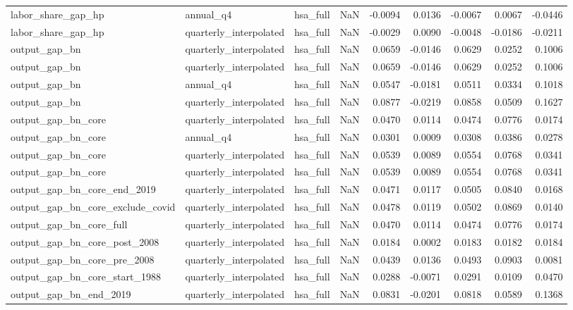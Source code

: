\begin{tabular}{lllrrrrrr}
labor\_share\_gap\_hp & annual\_q4 & hsa\_full & NaN & -0.0094 & 0.0136 & -0.0067 & 0.0067 & -0.0446 \\
labor\_share\_gap\_hp & quarterly\_interpolated & hsa\_full & NaN & -0.0029 & 0.0090 & -0.0048 & -0.0186 & -0.0211 \\
output\_gap\_bn & quarterly\_interpolated & hsa\_full & NaN & 0.0659 & -0.0146 & 0.0629 & 0.0252 & 0.1006 \\
output\_gap\_bn & quarterly\_interpolated & hsa\_full & NaN & 0.0659 & -0.0146 & 0.0629 & 0.0252 & 0.1006 \\
output\_gap\_bn & annual\_q4 & hsa\_full & NaN & 0.0547 & -0.0181 & 0.0511 & 0.0334 & 0.1018 \\
output\_gap\_bn & quarterly\_interpolated & hsa\_full & NaN & 0.0877 & -0.0219 & 0.0858 & 0.0509 & 0.1627 \\
output\_gap\_bn\_core & quarterly\_interpolated & hsa\_full & NaN & 0.0470 & 0.0114 & 0.0474 & 0.0776 & 0.0174 \\
output\_gap\_bn\_core & annual\_q4 & hsa\_full & NaN & 0.0301 & 0.0009 & 0.0308 & 0.0386 & 0.0278 \\
output\_gap\_bn\_core & quarterly\_interpolated & hsa\_full & NaN & 0.0539 & 0.0089 & 0.0554 & 0.0768 & 0.0341 \\
output\_gap\_bn\_core & quarterly\_interpolated & hsa\_full & NaN & 0.0539 & 0.0089 & 0.0554 & 0.0768 & 0.0341 \\
output\_gap\_bn\_core\_end\_2019 & quarterly\_interpolated & hsa\_full & NaN & 0.0471 & 0.0117 & 0.0505 & 0.0840 & 0.0168 \\
output\_gap\_bn\_core\_exclude\_covid & quarterly\_interpolated & hsa\_full & NaN & 0.0478 & 0.0119 & 0.0502 & 0.0869 & 0.0140 \\
output\_gap\_bn\_core\_full & quarterly\_interpolated & hsa\_full & NaN & 0.0470 & 0.0114 & 0.0474 & 0.0776 & 0.0174 \\
output\_gap\_bn\_core\_post\_2008 & quarterly\_interpolated & hsa\_full & NaN & 0.0184 & 0.0002 & 0.0183 & 0.0182 & 0.0184 \\
output\_gap\_bn\_core\_pre\_2008 & quarterly\_interpolated & hsa\_full & NaN & 0.0439 & 0.0136 & 0.0493 & 0.0903 & 0.0081 \\
output\_gap\_bn\_core\_start\_1988 & quarterly\_interpolated & hsa\_full & NaN & 0.0288 & -0.0071 & 0.0291 & 0.0109 & 0.0470 \\
output\_gap\_bn\_end\_2019 & quarterly\_interpolated & hsa\_full & NaN & 0.0831 & -0.0201 & 0.0818 & 0.0589 & 0.1368 \\

\end{tabular}
